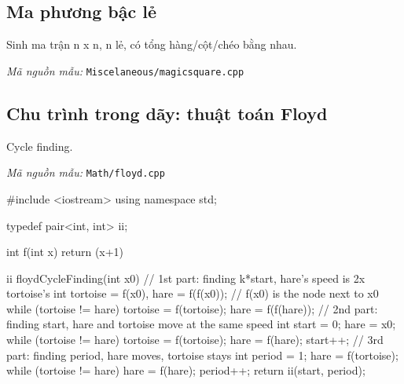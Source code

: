 \documentclass[11pt]{article}
\newcommand{\codepath}[1]{\par\noindent\textit{Mã nguồn mẫu:} \texttt{#1}\par}
\begin{document}
\subsection{Ma phương bậc lẻ}

Sinh ma trận n x n, n lẻ, có tổng hàng/cột/chéo bằng nhau.

\codepath{Miscelaneous/magicsquare.cpp}

\begingroup\scriptsize
{}
\endgroup


\subsection{Chu trình trong dãy: thuật toán Floyd}

Cycle finding.

\codepath{Math/floyd.cpp}

\begingroup\scriptsize
\begin{vncode}
#include <iostream>
using namespace std;

typedef pair<int, int> ii;

int f(int x) {
	return (x+1)%
}

ii floydCycleFinding(int x0) {
	// 1st part: finding k*start, hare’s speed is 2x tortoise’s
	int tortoise = f(x0), hare = f(f(x0)); // f(x0) is the node next to x0
	while (tortoise != hare) { tortoise = f(tortoise); hare = f(f(hare)); }
	// 2nd part: finding start, hare and tortoise move at the same speed
	int start = 0; hare = x0;
	while (tortoise != hare) { tortoise = f(tortoise); hare = f(hare); start++;}
	// 3rd part: finding period, hare moves, tortoise stays
	int period = 1; hare = f(tortoise);
	while (tortoise != hare) { hare = f(hare); period++; }
	return ii(start, period);
}
\end{vncode}
\endgroup
\end{document}
